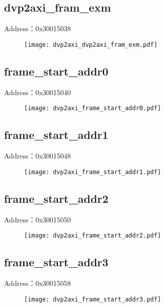 \subsection{dvp2axi\_fram\_exm}
\label{dvp2axi-dvp2axi-fram-exm}
Address：0x30015038
 \begin{figure}[H]
\texttt{[image: dvp2axi\_dvp2axi\_fram\_exm.pdf]}
\end{figure}

\subsection{frame\_start\_addr0}
\label{dvp2axi-frame-start-addr0}
Address：0x30015040
 \begin{figure}[H]
\texttt{[image: dvp2axi\_frame\_start\_addr0.pdf]}
\end{figure}

\subsection{frame\_start\_addr1}
\label{dvp2axi-frame-start-addr1}
Address：0x30015048
 \begin{figure}[H]
\texttt{[image: dvp2axi\_frame\_start\_addr1.pdf]}
\end{figure}

\subsection{frame\_start\_addr2}
\label{dvp2axi-frame-start-addr2}
Address：0x30015050
 \begin{figure}[H]
\texttt{[image: dvp2axi\_frame\_start\_addr2.pdf]}
\end{figure}

\subsection{frame\_start\_addr3}
\label{dvp2axi-frame-start-addr3}
Address：0x30015058
 \begin{figure}[H]
\texttt{[image: dvp2axi\_frame\_start\_addr3.pdf]}
\end{figure}

